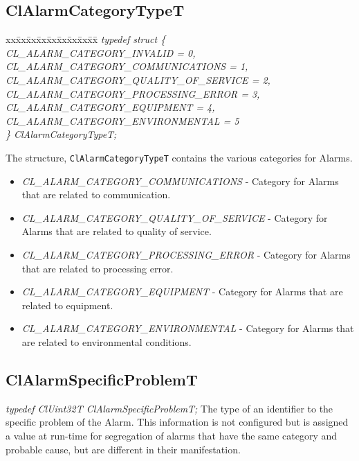 \begin{flushleft}
\subsection{ClAlarmCategoryTypeT}
\begin{tabbing}
xx\=xx\=xx\=xx\=xx\=xx\=xx\=xx\=xx\=\kill
\textit{typedef struct \{}\\
\>\>\>\>\textit{CL\_ALARM\_CATEGORY\_INVALID = 0,}\\
\>\>\>\>\textit{CL\_ALARM\_CATEGORY\_COMMUNICATIONS = 1,}\\
\>\>\>\>\textit{CL\_ALARM\_CATEGORY\_QUALITY\_OF\_SERVICE = 2,}\\
\>\>\>\>\textit{CL\_ALARM\_CATEGORY\_PROCESSING\_ERROR = 3,}\\
\>\>\>\>\textit{CL\_ALARM\_CATEGORY\_EQUIPMENT = 4,}\\
\>\>\>\>\textit{CL\_ALARM\_CATEGORY\_ENVIRONMENTAL = 5}\\
\textit{\} ClAlarmCategoryTypeT;}\end{tabbing}
The structure, {\tt{ClAlarmCategoryTypeT}} contains the various categories for Alarms.
\begin{itemize}
\item
\textit{CL\_\-ALARM\_\-CATEGORY\_\-COMMUNICATIONS} - Category for Alarms that are related to communication.
\item
\textit{CL\_\-ALARM\_\-CATEGORY\_\-QUALITY\_\-OF\_\-SERVICE} - Category for Alarms that are related to
quality of service.
\item
\textit{CL\_\-ALARM\_\-CATEGORY\_\-PROCESSING\_\-ERROR} - Category for Alarms that are related to
processing error.
\item
\textit{CL\_\-ALARM\_\-CATEGORY\_\-EQUIPMENT} - Category for Alarms that are related to equipment.
\item
\textit{CL\_\-ALARM\_\-CATEGORY\_\-ENVIRONMENTAL} - Category for Alarms that are related to environmental
conditions.
\end{itemize}

\subsection{ClAlarmSpecificProblemT}
\textit{typedef ClUint32T ClAlarmSpecificProblemT;}
\newline
\newline
 The type of an identifier to the specific problem of the Alarm.
 This information is not configured but is assigned a value at run-time
 for segregation of alarms that have the same category and probable cause,
 but are different in their manifestation.



\end{flushleft}

